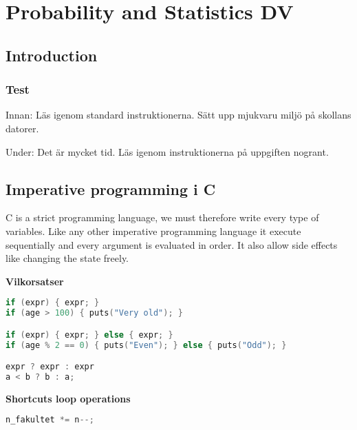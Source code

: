 \chapter{Probability and Statistics DV}

\newpage


\section{Introduction}

\subsection{Test}
Innan: \newline
Läs igenom standard instruktionerna. \newline
Sätt upp mjukvaru miljö på skollans datorer. \newline

Under: \newline
Det är mycket tid. \newline
Läs igenom instruktionerna på uppgiften nogrant. \newline



\section{Imperative programming i C}
C is a strict programming language, we must therefore write every type of variables.
Like any other imperative programming language it execute sequentially and every argument is evaluated
in order. It also allow side effects like changing the state freely. 

\noindent\textbf{Vilkorsatser}
\begin{lstlisting}[language=C]
if (expr) { expr; } 
if (age > 100) { puts("Very old"); } 

if (expr) { expr; } else { expr; }
if (age % 2 == 0) { puts("Even"); } else { puts("Odd"); }

expr ? expr : expr
a < b ? b : a;
\end{lstlisting}

\noindent\textbf{Shortcuts loop operations}
\begin{lstlisting}[language=C]
n_fakultet *= n--;
\end{lstlisting}


